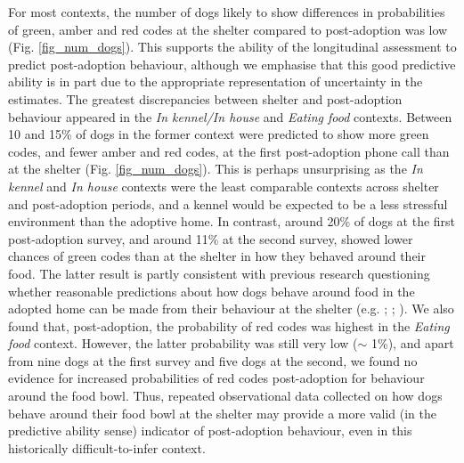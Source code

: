 \documentclass[12pt]{article}
\begin{document}
For most contexts, the number of dogs likely to show differences in probabilities of green, amber and red codes at the shelter compared to post-adoption was low (Fig. \ref{fig_num_dogs}). This supports the ability of the longitudinal assessment to predict post-adoption behaviour, although we emphasise that this good predictive ability is in part due to the appropriate representation of uncertainty in the estimates. The greatest discrepancies between shelter and post-adoption behaviour appeared in the \textit{In kennel/In house} and \textit{Eating food} contexts. Between 10 and 15\% of dogs in the former context were predicted to show more green codes, and fewer amber and red codes, at the first post-adoption phone call than at the shelter (Fig. \ref{fig_num_dogs}). This is perhaps unsurprising as the \textit{In kennel} and \textit{In house} contexts were the least comparable contexts across shelter and post-adoption periods, and a kennel would be expected to be a less stressful environment than the adoptive home. In contrast, around 20\% of dogs at the first post-adoption survey, and around 11\% at the second survey, showed lower chances of green codes than at the shelter in how they behaved around their food. The latter result is partly consistent with previous research questioning whether reasonable predictions about how dogs behave around food in the adopted home can be made from their behaviour at the shelter (e.g. \cite{marder2013}; \cite{mohangibbons2012}; \cite{clay2020behaviour}). We also found that, post-adoption, the probability of red codes was highest in the \textit{Eating food} context. However, the latter probability was still very low ($\sim$ 1\%), and apart from nine dogs at the first survey and five dogs at the second, we found no evidence for increased probabilities of red codes post-adoption for behaviour around the food bowl. Thus, repeated observational data collected on how dogs behave around their food bowl at the shelter may provide a more valid (in the predictive ability sense) indicator of post-adoption behaviour, even in this historically difficult-to-infer context.
\end{document}
